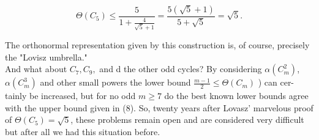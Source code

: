 \documentclass[12pt]{memoir}
\begin{document}
\[
\Theta(C_5) \leq {\frac{5}{1 + {\frac{4}{\sqrt{5}+1}}}}={\frac{5(\sqrt{5}+1)}{5+\sqrt{5}}} = \sqrt{5}.
\]

The orthonormal representation given by this construction is, of course, 
precisely the "Lovisz umbrella."\\


And what about $C_7, C_9,$ and d the other odd cycles? By considering $\alpha(C_m^2)$,
$\alpha(C_m^3)$ and other small powers the lower bound ${\frac{m-1}{2}} \leq \Theta(C_m)$ ) can cer-
tainly be increased, but for no odd $m \geq 7$  do the best known lower bounds
agree with the upper bound given in (8). So, twenty years after Lovasz' 
marvelous proof of $\Theta(C_5) = \sqrt{5}$, these problems remain open and are 
considered very difficult \text{---} but after all we had this situation before.
\end{document}
